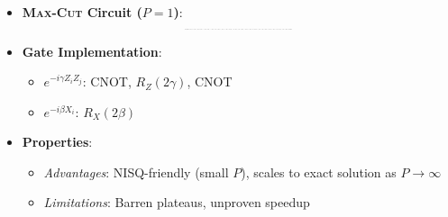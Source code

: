 \begin{multicols}{3}
\begin{itemize}[leftmargin=*,nosep,topsep=0pt]
                    \item \textbf{\textsc{Max-Cut} Circuit ($P=1$)}:
                      \[
                        \resizebox{0.25\textwidth}{!}{
                          \begin{quantikz}
                            \lstick{$q_0$} & \gate{H} & \gate{e^{-i\gamma Z Z}} & \gate{e^{-i\gamma Z Z}} & \gate{R_X(2\beta)} & \meter{} \\
                            \lstick{$q_1$} & \gate{H} & \gate[2]{Z Z} & \qw & \gate{R_X(2\beta)} & \meter{} \\
                            \lstick{$q_2$} & \gate{H} & \qw & \gate[2]{Z Z} & \gate{R_X(2\beta)} & \meter{} \\
                            \lstick{$q_3$} & \gate{H} & \qw & \qw & \gate{R_X(2\beta)} & \meter{}
                          \end{quantikz}
                        }
                      \]

                    \item \textbf{Gate Implementation}:
                      \begin{itemize}[nosep]
                        \item $e^{-i\gamma Z_i Z_j}$: CNOT, $R_Z(2\gamma)$, CNOT
                        \item $e^{-i\beta X_i}$: $R_X(2\beta)$
                      \end{itemize}

                    \item \textbf{Properties}:
                      \begin{itemize}[nosep]
                        \item \textit{Advantages}: NISQ-friendly (small $P$),
                          scales to exact solution as $P \to \infty$
                        \item \textit{Limitations}: Barren plateaus, unproven
                          speedup
                      \end{itemize}
                  \end{itemize}



\end{multicols}
